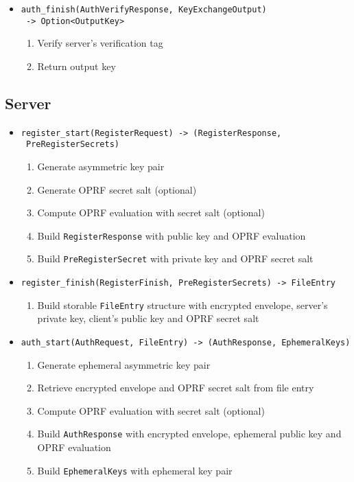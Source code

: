﻿\documentclass[../report.tex]{subfiles}
\begin{document}
\begin{itemize}
 \item \verb|auth_finish(AuthVerifyResponse, KeyExchangeOutput)|\\
       \verb| -> Option<OutputKey>|
  \begin{enumerate}
    \item Verify server's verification tag
    \item Return output key
  \end{enumerate}
  
\end{itemize}
\subsection{Server}
\begin{itemize}
 \item \verb|register_start(RegisterRequest) -> (RegisterResponse,|\\
       \verb| PreRegisterSecrets)|
  \begin{enumerate}
    \item Generate asymmetric key pair
    \item Generate OPRF secret salt (optional)
    \item Compute OPRF evaluation with secret salt (optional)
    \item Build \verb|RegisterResponse| with public key and OPRF evaluation
    \item Build \verb|PreRegisterSecret| with private key and OPRF secret salt
  \end{enumerate}
  
 \item \verb|register_finish(RegisterFinish, PreRegisterSecrets) -> FileEntry|
  \begin{enumerate}
    \item Build storable \verb|FileEntry| structure with encrypted envelope, server's private key, client's public key and OPRF secret salt
  \end{enumerate}
  
  
  
 \item \verb|auth_start(AuthRequest, FileEntry) -> (AuthResponse, EphemeralKeys)|
  \begin{enumerate}
    \item Generate ephemeral asymmetric key pair
    \item Retrieve encrypted envelope and OPRF secret salt from file entry
    \item Compute OPRF evaluation with secret salt (optional)
    \item Build \verb|AuthResponse| with encrypted envelope, ephemeral public key and OPRF evaluation
    \item Build \verb|EphemeralKeys| with ephemeral key pair
  \end{enumerate}
  

\end{itemize}
\end{document}
